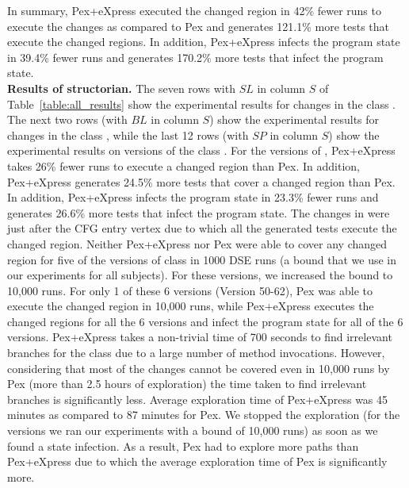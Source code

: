 In summary, Pex+eXpress executed the changed region in 42\% fewer runs to execute the changes as compared to Pex and generates 121.1\% more tests that execute the changed regions. In addition, Pex+eXpress infects the program state in 39.4\% fewer runs and generates 170.2\% more tests that infect the program state.
\\ \textbf{Results of structorian.} The seven rows with $SL$ in column $S$ of Table~\ref{table:all_results} show the experimental results for changes in the class . The next two rows (with $BL$ in column $S$) show the experimental results for changes in the class , 
 while the last 12 rows (with $SP$ in column $S$) show the experimental results on versions of the class . For the versions of , Pex+eXpress takes 26\% fewer runs to execute a changed region than Pex. In addition, Pex+eXpress generates 24.5\% more tests that cover a changed region than Pex. In addition, Pex+eXpress infects the program state in 23.3\% fewer runs and generates 26.6\% more tests that infect the program state. The changes in  were just after the CFG entry vertex due to which all the generated tests execute the changed region.
 	Neither Pex+eXpress nor Pex were able to cover any changed region for five of the versions of class  in 1000 DSE runs (a bound that we use in our experiments for all subjects). For these versions, we increased the bound to 10,000 runs. For only 1 of these 6 versions (Version 50-62), Pex was able to execute the changed region in 10,000 runs, while Pex+eXpress executes the changed regions for all the 6 versions and infect the program state for all of the 6 versions. Pex+eXpress takes a non-trivial time of 700 seconds to find irrelevant branches for the class  due to a large number of method invocations. However, considering that most of the changes cannot be covered even in 10,000 runs by Pex (more than 2.5 hours of exploration) the time taken to find irrelevant branches is significantly less. Average exploration time of Pex+eXpress was 45 minutes as compared to 87 minutes for Pex. We stopped the exploration (for the versions we ran our experiments with a bound of 10,000 runs) as soon as we found a state infection. As a result, Pex had to explore more paths than Pex+eXpress due to which the average exploration time of Pex is significantly more. 
